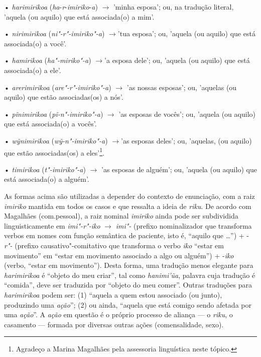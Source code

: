 • \emph{harimirikoa} (\emph{ha}-\emph{r}-\emph{imiriko}-\emph{a}) $\rightarrow$
'minha esposa'; ou, na tradução literal, 'aquela (ou aquilo) que está
associada(o) a mim'.

• \emph{nirimirikoa} (\emph{ni"-r"-imiriko"-a}) $\rightarrow$'tua esposa'; ou, 'aquela
(ou aquilo) que está associada(o) a você'.

• \emph{hamirikoa} (\emph{ha"-miriko"-a}) $\rightarrow$'a esposa dele'; ou, 'aquela
(ou aquilo) que está associada(o) a ele'.

• \emph{arerimirikoa} (\emph{are"-r"-imiriko"-a}) $\rightarrow$ 'as nossas esposas';
ou, 'aquelas (ou aquilo) que estão associadas(os) a nós'.

• \emph{pĩnimirikoa} (\emph{pĩ-n"-imiriko"-a}) $\rightarrow$ 'as esposas de vocês';
ou, 'aquela (ou aquilo) que está associada(o) a vocês'.

• \emph{wỹnimirikoa} (\emph{wỹ-n"-imiriko"-a}) $\rightarrow$'as esposas deles'; ou,
'aquelas, (ou aquilo) que estão associadas(os) a eles'\footnote{Agradeço
  a Marina Magalhães pela assessoria linguística neste tópico.}.

• \emph{timirikoa} (\emph{t"-imiriko"-a}) $\rightarrow$ 'as esposas de alguém'; ou,
'aquela (ou aquilo) que está associada(o) a alguém'.

As formas acima são utilizadas a depender do contexto de enunciação, com
a raiz \emph{imiriko} mantida em todos os casos e que ressalta a ideia
de \emph{riku}. De acordo com Magalhães (com.pessoal), a raiz nominal
\emph{imiriko} ainda pode ser subdividida linguisticamente em
\emph{{imi"-r"-iko}} $\rightarrow$ \emph{imi"-} (prefixo nominalizador que transforma
verbos em nomes com função semântica de paciente, isto é, ``aquilo que
\ldots{}'') + -\emph{r"-} (prefixo causativo"-comitativo que transforma o verbo
\emph{iko} ``estar em movimento'' em ``estar em movimento associado a algo
ou alguém'') + -\emph{iko} (verbo, ``estar em movimento''). Desta forma,
uma tradução menos elegante para \emph{harimirikoa} é ``objeto do meu
criar'', tal como \emph{hanimi'ũa}, palavra cuja tradução é ``comida'',
deve ser traduzida por ``objeto do meu comer''. Outras traduções para
\emph{harimirikoa} podem ser: (1) ``aquela a quem estou associado (ou
junto), produzindo uma \emph{ação}''; (2) ou ainda, ``aquela que está
comigo sendo afetada por uma \emph{ação}''. A \emph{ação} em questão é o
próprio processo de aliança --- o \emph{riku}, o casamento --- formada por
diversas outras ações (comensalidade, sexo).

